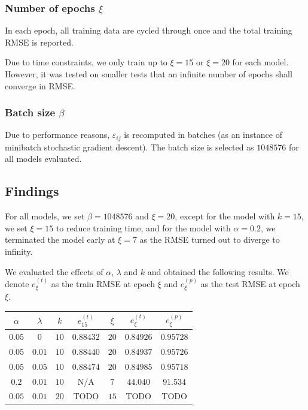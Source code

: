 \documentclass[final]{cvpr}
\begin{document}
\subsubsection{Number of epochs $\xi$}
In each epoch, all training data are cycled through once
and the total training RMSE is reported.

Due to time constraints, we only train up to $\xi=15$ or $\xi=20$ for each model.
However, it was tested on smaller tests that
an infinite number of epochs shall converge in RMSE.

\subsubsection{Batch size $\beta$}
Due to performance reasons, $\varepsilon_{ij}$ is recomputed in batches
(as an instance of minibatch stochastic gradient descent).
The batch size is selected as $1048576$ for all models evaluated.

\subsection{Findings}
For all models, we set $\beta=1048576$ and $\xi=20$,
except for the model with $k=15$, we set $\xi=15$ to reduce training time,
and for the model with $\alpha=0.2$, we terminated the model early at $\xi=7$
as the RMSE turned out to diverge to infinity.

We evaluated the effects of $\alpha$, $\lambda$ and $k$ and obtained the following results.
We denote $e_\xi^{(t)}$ as the train RMSE at epoch $\xi$
and $e_\xi^{(p)}$ as the test RMSE at epoch $\xi$.

\hspace{-0.5cm}
\begin{tabular}{|c|c|c|c|c|c|c|}
	\hline
	$\alpha$ & $\lambda$ & $k$ & $e_{15}^{(t)}$ & $\xi$ & $e_\xi^{(t)}$ & $e_\xi^{(p)}$
	\\ \hline
	$0.05$ & $0$ & $10$ & $0.88432$ & $20$ & $0.84926$ & $0.95728$
	\\ \hline
	$0.05$ & $0.01$ & $10$ & $0.88440$ & $20$ & $0.84937$ & $0.95726$
	\\ \hline
	$0.05$ & $0.05$ & $10$ & $0.88474$ & $20$ & $0.84985$ & $0.95718$
	\\ \hline
	$0.2$ & $0.01$ & $10$ & N/A & $7$ & $44.040$ & $91.534$
	\\ \hline
	$0.05$ & $0.01$ & $20$ & TODO & $15$ & TODO & TODO
	\\ \hline
\end{tabular}
\end{document}
